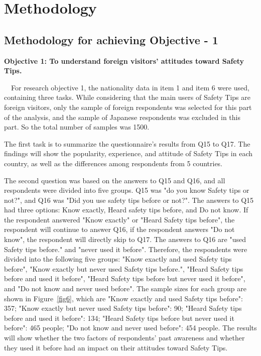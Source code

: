 


\chapter{Methodology }

\section{Methodology for achieving Objective - 1 }

\textbf{Objective 1: To understand foreign visitors' attitudes toward Safety Tips.}

　For research objective 1, the nationality data in item 1 and item 6 were used, containing three tasks. While considering that the main users of Safety Tips are foreign visitors, only the sample of foreign respondents was selected for this part of the analysis, and the sample of Japanese respondents was excluded in this part. So the total number of samples was 1500.

The first task is to summarize the questionnaire's results from Q15 to Q17. The findings will show the popularity, experience, and attitude of Safety Tips in each country, as well as the differences among respondents from 5 countries.

The second question was based on the answers to Q15 and Q16, and all respondents were divided into five groups. Q15 was "do you know Safety tips or not?", and Q16 was "Did you use safety tips before or not?". The answers to Q15 had three options: Know exactly, Heard safety tips before, and Do not know. If the respondent answered "Know exactly" or "Heard Safety tips before", the respondent will continue to answer Q16, if the respondent answers "Do not know", the respondent will directly skip to Q17. The answers to Q16 are "used Safety tips before." and "never used it before". Therefore, the respondents were divided into the following five groups: "Know exactly and used Safety tips before", "Know exactly but never used Safety tips before.", "Heard Safety tips before and used it before", "Heard Safety tips before but never used it before", and "Do not know and never used before". The sample sizes for each group are shown in Figure~\ref{fig6}, which are "Know exactly and used Safety tips before": 357; "Know exactly but never used Safety tips before": 90; "Heard Safety tips before and used it before": 134; "Heard Safety tips before but never used it before": 465 people; "Do not know and never used before": 454 people. The results will show whether the two factors of respondents' past awareness and whether they used it before had an impact on their attitudes toward Safety Tips.

